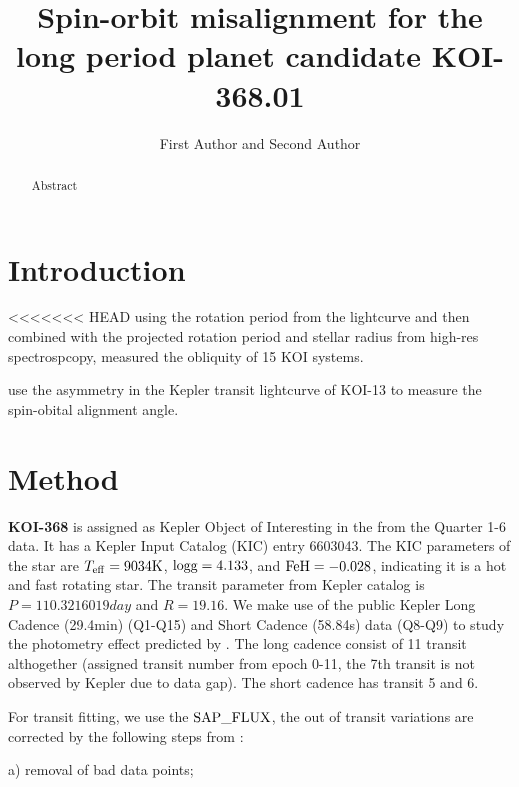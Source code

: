 \documentclass[preprint]{emulateapj}
\makeatletter
\newcommand{\myemail}{email@email.com}
\makeatother
\begin{document}
\linenumbers

\title{Spin-orbit misalignment for the long period planet candidate KOI-368.01}

\author{First Author and
Second Author}

\altaffiltext{1}{Affil2; \email{\myemail}}

\begin{abstract}
Abstract
\end{abstract}


\section{Introduction}
\label{sec:introduction}

<<<<<<< HEAD
\citet{Hirano:2012} 
using the rotation period from the lightcurve and 
then combined with the projected rotation period and stellar radius from 
high-res spectrospcopy, measured the obliquity of 15 KOI systems. 

\citet{Barnes:2011} use the asymmetry in the Kepler transit lightcurve of KOI-13 
to measure the spin-obital alignment angle. 

\section{Method}
\label{sec:method}

{\bf KOI-368} is assigned as Kepler Object of Interesting in the 
\citep{Batalha:2013} from the Quarter 1-6 data. It has a Kepler Input Catalog (KIC) 
entry 6603043. The KIC parameters of the star are $T_{\rm eff} = 9034 {\rm K}$,  
$\rm logg=4.133$, and $\rm FeH = -0.028$, indicating it is a hot and 
fast rotating star. The transit parameter from Kepler catalog is 
$P = 110.3216019 day$ and $R=19.16$\rearth.
We make use of the public Kepler Long Cadence (29.4min) (Q1-Q15) and 
Short Cadence (58.84s) data (Q8-Q9) to study the photometry effect 
predicted by \citet{Barnes:2009}.
The long cadence \lcs consist of 11 transit althogether (assigned transit 
number from epoch 0-11, the 7th transit is not observed by Kepler due to data gap). 
The short cadence \lcs has transit 5 and 6. 

For transit fitting, we use the $\rm SAP\_FLUX$, the out of transit 
variations are corrected by the following steps from \citet{Huang:2013}:

a) removal of bad data points;
\end{document}

